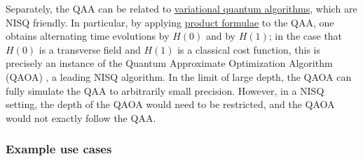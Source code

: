 \begin{refsection}
Separately, the QAA can be related to \hyperref[prim:VQA]{variational quantum algorithms}, which are NISQ friendly. In particular, by applying \hyperref[prim:ProductFormulae]{product formulae} to the QAA, one obtains alternating time evolutions by $H(0)$ and by $H(1)$; in the case that $H(0)$ is a transverse field and $H(1)$ is a classical cost function, this is precisely an instance of the Quantum Approximate Optimization Algorithm (QAOA) \cite{farhi2014QAOA}, a leading NISQ algorithm. In the limit of large depth, the QAOA can fully simulate the QAA to arbitrarily small precision. However, in a NISQ setting, the depth of the QAOA would need to be restricted, and the QAOA would not exactly follow the QAA. 


\subsubsection*{Example use cases}
 

\end{refsection}
